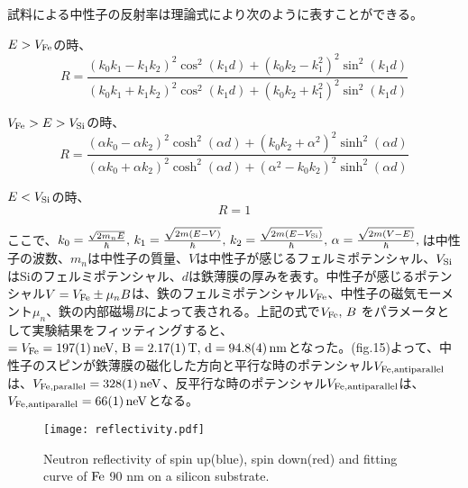 \documentclass[onecolumn]{preport}
\begin{document}
試料による中性子の反射率は理論式により次のように表すことができる。

$E>V_{\rm Fe}$の時、
\begin{equation}
R=\frac{(k_0k_1-k_1k_2)^2\cos^2(k_1d)+(k_0k_2-k_1^2)^2\sin^2 (k_1d)}{(k_0k_1+k_1k_2)^2\cos^2(k_1d)+(k_0k_2+k_1^2)^2\sin^2 (k_1d)}
\end{equation}

$V_{\rm Fe}>E>V_{\rm Si}$の時、
\begin{equation}
R=\frac{(\alpha k_0-\alpha k_2)^2\cosh^2(\alpha d)+(k_0k_2+\alpha^2)^2\sinh^2 (\alpha d)}{(\alpha k_0+\alpha k_2)^2\cosh^2(\alpha d)+(\alpha^2-k_0k_2)^2\sinh^2 (\alpha d)}
\end{equation}

$E<V_{\rm Si}$の時、
\begin{equation}
R=1
\end{equation}

ここで、$k_0=\frac {\sqrt{2m_nE} }{\hbar},\,k_1=\frac {\sqrt{2m(E-V)} }{\hbar},\,k_2=\frac {\sqrt{2m(E-V_{\rm Si})} }{\hbar},\,\alpha=\frac {\sqrt{2m(V-E)} }{\hbar},\,$は中性子の波数、$m_n$は中性子の質量、$V$は中性子が感じるフェルミポテンシャル、$V_{\rm Si}$はSiのフェルミポテンシャル、$d$は鉄薄膜の厚みを表す。中性子が感じるポテンシャル$V=V_{\rm Fe}\pm \mu_n B$は、鉄のフェルミポテンシャル$V_{\rm Fe}$、中性子の磁気モーメント$\mu_n$、鉄の内部磁場$B$によって表される。上記の式で$V_{\rm Fe},\,B$ をパラメータとして実験結果をフィッティングすると、$=V_{\rm Fe}=197(1)\,\rm neV,\,B=2.17(1)\,\rm T,\,d=94.8(4)\,\rm nm$となった。(fig.15)よって、中性子のスピンが鉄薄膜の磁化した方向と平行な時のポテンシャル$V_{\rm Fe,antiparallel}$は、$V_{\rm Fe,parallel}=328(1)\,\rm neV$、反平行な時のポテンシャル$V_{\rm Fe,antiparallel}$は、$V_{\rm Fe,antiparallel}=66(1)\,\rm neV$となる。


\begin{comment}
\begin{equation}
k_0=\frac {\sqrt{2m_nE} }{\hbar}
\end{equation}

\begin{equation}
k_1=\frac {\sqrt{2m(E-V_{\rm Fe})} }{\hbar}
\end{equation}

\begin{equation}
k_2=\frac {\sqrt{2m(E-V_{\rm Si})} }{\hbar}
\end{equation}
\end{comment}

\begin{figure}[tbh]
 \centering
 \texttt{[image: reflectivity.pdf]}
 \caption{Neutron reflectivity of spin up(blue), spin down(red) and fitting curve of $\rm Fe$ 90 nm on a silicon substrate.}
\end{figure}
\end{document}
